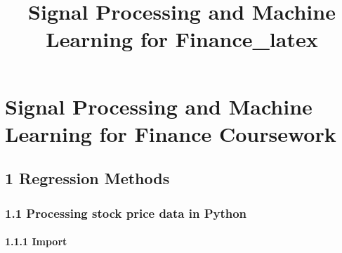 \documentclass[11pt]{article}
\title{Signal Processing and Machine Learning for Finance\_latex}
\begin{document}
    
    \maketitle
    
    

    
    \hypertarget{signal-processing-and-machine-learning-for-finance-coursework}{%
\section{Signal Processing and Machine Learning for Finance
Coursework}\label{signal-processing-and-machine-learning-for-finance-coursework}}

    \hypertarget{regression-methods}{%
\subsection{1 Regression Methods}\label{regression-methods}}

    \hypertarget{processing-stock-price-data-in-python}{%
\subsubsection{1.1 Processing stock price data in
Python}\label{processing-stock-price-data-in-python}}

    \hypertarget{import}{%
\paragraph{1.1.1 Import}\label{import}}
\end{document}
